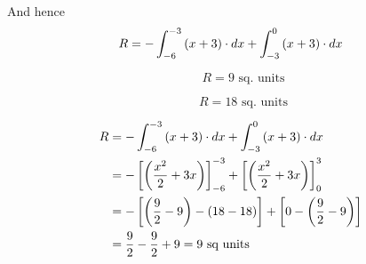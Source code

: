 \documentclass[14pt,fleqn]{extarticle}
\begin{document}
And hence 
\[ R = -\int_{-6}^{-3} \left(x+3 \right)\cdot dx + \int_{-3}^0 \left(x+3 \right)\cdot dx \]

\newcard 

\[ \qquad R = 9\text{ sq. units} \]

\newcard 

 \[ \qquad R = 18\text{ sq. units} \]
 
 \newcard 
 
 \begin{align}
 R &= -\int_{-6}^{-3} \left(x+3 \right)\cdot dx + \int_{-3}^0 \left(x+3 \right)\cdot dx \\
 &= - \left[\left(\frac{x^2}{2} + 3x\right) \right]_{-6}^{-3} + \left[\left(\frac{x^2}{2} + 3x\right) \right]_0^3 \\
 &= -\left[\left(\frac{9}{2}-9\right) - \left(18-18\right) \right] + \left[0-\left(\frac{9}{2}-9\right)\right]\\
 &= \frac{9}{2} - \frac{9}{2} + 9 = 9\text{ sq units}
\end{align}
\end{document}
